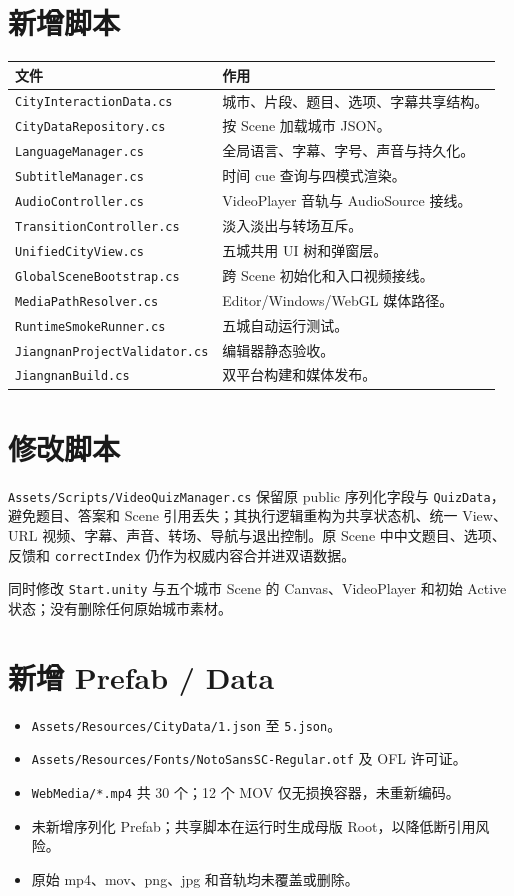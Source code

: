 \documentclass[UTF8,a4paper,11pt]{ctexart}
\newcommand{\code}[1]{\texttt{#1}}
\begin{document}
\section{新增脚本}
\begin{longtable}{p{7.1cm}p{7.4cm}}
\toprule
文件 & 作用\\
\midrule
\endhead
\code{CityInteractionData.cs} & 城市、片段、题目、选项、字幕共享结构。\\
\code{CityDataRepository.cs} & 按 Scene 加载城市 JSON。\\
\code{LanguageManager.cs} & 全局语言、字幕、字号、声音与持久化。\\
\code{SubtitleManager.cs} & 时间 cue 查询与四模式渲染。\\
\code{AudioController.cs} & VideoPlayer 音轨与 AudioSource 接线。\\
\code{TransitionController.cs} & 淡入淡出与转场互斥。\\
\code{UnifiedCityView.cs} & 五城共用 UI 树和弹窗层。\\
\code{GlobalSceneBootstrap.cs} & 跨 Scene 初始化和入口视频接线。\\
\code{MediaPathResolver.cs} & Editor/Windows/WebGL 媒体路径。\\
\code{RuntimeSmokeRunner.cs} & 五城自动运行测试。\\
\code{JiangnanProjectValidator.cs} & 编辑器静态验收。\\
\code{JiangnanBuild.cs} & 双平台构建和媒体发布。\\
\bottomrule
\end{longtable}

\section{修改脚本}
\code{Assets/Scripts/VideoQuizManager.cs} 保留原 public 序列化字段与 \code{QuizData}，避免题目、答案和 Scene 引用丢失；其执行逻辑重构为共享状态机、统一 View、URL 视频、字幕、声音、转场、导航与退出控制。原 Scene 中中文题目、选项、反馈和 \code{correctIndex} 仍作为权威内容合并进双语数据。

同时修改 \code{Start.unity} 与五个城市 Scene 的 Canvas、VideoPlayer 和初始 Active 状态；没有删除任何原始城市素材。

\section{新增 Prefab / Data}
\begin{itemize}
\item \code{Assets/Resources/CityData/1.json} 至 \code{5.json}。
\item \code{Assets/Resources/Fonts/NotoSansSC-Regular.otf} 及 OFL 许可证。
\item \code{WebMedia/*.mp4} 共 30 个；12 个 MOV 仅无损换容器，未重新编码。
\item 未新增序列化 Prefab；共享脚本在运行时生成母版 Root，以降低断引用风险。
\item 原始 mp4、mov、png、jpg 和音轨均未覆盖或删除。
\end{itemize}
\end{document}

